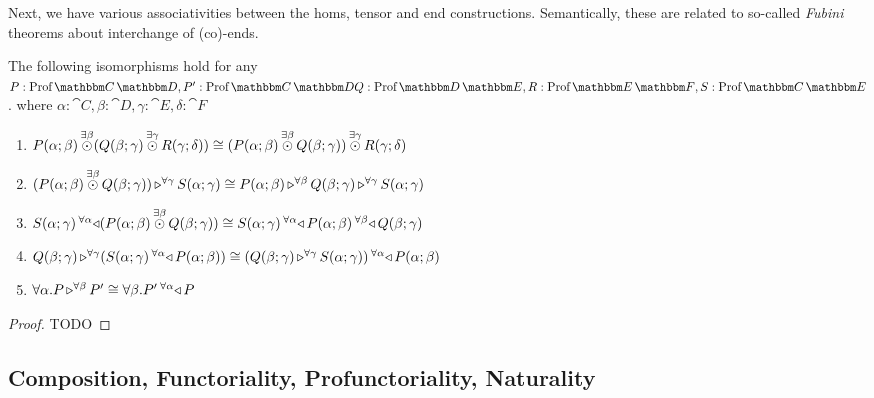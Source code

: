 \documentclass{llncs}
\begin{document}
Next, we have various associativities between the homs, tensor and end
constructions. Semantically, these are related to so-called
\emph{Fubini} theorems about interchange of (co)-ends.
\begin{lemma}[{Fubini}]
  \label{lem:fubini}
  The following isomorphisms hold for any $P : \harr {\cat C}{\cat D},
  P' : \harr {\cat C}{\cat D} Q :\harr {\cat D}{\cat E}, R : \harr
  {\cat E} {\cat F}, S : \harr {\cat C} {\cat E}$. where $\alpha:\cat
  C, \beta:\cat D, \gamma : \cat E, \delta: \cat F$
  \begin{enumerate}
  \item $\tensorexistsXwithYandZ {\beta} {\harrapp P \alpha \beta} {(\tensorexistsXwithYandZ \gamma {\harrapp Q \beta \gamma} {\harrapp R \gamma \delta})} \cong \tensorexistsXwithYandZ {\gamma} {(\tensorexistsXwithYandZ \beta {\harrapp P \alpha \beta} {\harrapp Q \beta \gamma})} {\harrapp R \gamma \delta}$
  \item $\homrallXYtoZ {\gamma} {(\tensorexistsXwithYandZ \beta {\harrapp P \alpha \beta} {\harrapp Q \beta \gamma})} {\harrapp S \alpha \gamma} \cong \homrallXYtoZ \beta {\harrapp P \alpha \beta} {\homrallXYtoZ \gamma {\harrapp Q \beta \gamma} {\harrapp S \alpha \gamma}}$
  \item $\homlallXYtoZ {\alpha} {(\tensorexistsXwithYandZ \beta {\harrapp P \alpha \beta} {\harrapp Q \beta \gamma})} {\harrapp S \alpha \gamma} \cong \homlallXYtoZ \beta {\harrapp Q \beta \gamma} {\homlallXYtoZ \alpha {\harrapp P \alpha \beta} {\harrapp S \alpha \gamma}}$
  \item $\homrallXYtoZ \gamma {\harrapp Q \beta \gamma} {(\homlallXYtoZ \alpha {\harrapp P \alpha \beta} {\harrapp S \alpha \gamma})} \cong \homlallXYtoZ \alpha {\harrapp P \alpha \beta} {(\homrallXYtoZ \gamma {\harrapp Q \beta \gamma} {\harrapp S \alpha \gamma})}$
  \item $\pendallXdotY \alpha \homrallXYtoZ \beta P {P'} \cong \pendallXdotY \beta \homlallXYtoZ \alpha P {P'}$
  \end{enumerate}  
\end{lemma}
\begin{proof}
  TODO
\end{proof}
\subsection{Composition, Functoriality, Profunctoriality, Naturality}
\end{document}
